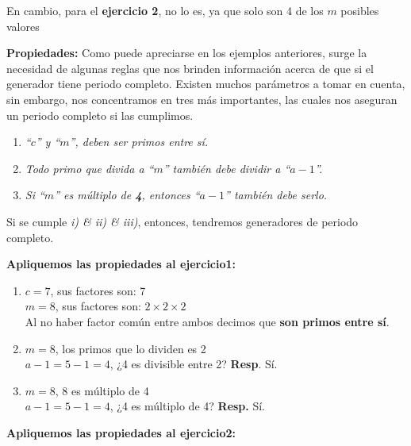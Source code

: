 \documentclass[11pt,letterpaper]{report}
\begin{document}
En cambio, para el \textbf{ejercicio 2}, no lo es, ya que solo son 4 de los $m$ posibles valores

\textbf{Propiedades:} Como puede apreciarse en los ejemplos anteriores, surge la necesidad de algunas reglas que nos brinden información acerca de que si el generador tiene periodo completo. Existen muchos parámetros a tomar en cuenta, sin embargo, nos concentramos en tres más importantes, las cuales nos aseguran un periodo completo si las cumplimos.

\begin{enumerate}[label=\roman*)]
\item \textit{``$c$'' y ``$m$'', deben ser primos entre sí.}
\item \textit{Todo primo que divida a ``$m$'' también debe dividir a ``$a-1$''.}
\item \textit{Si ``$m$'' es múltiplo de \textbf{4}, entonces ``$a-1$'' también debe serlo.}
\end{enumerate}

Si se cumple \textit{i) \& ii) \& iii)}, entonces, tendremos generadores de periodo completo.

\textbf{Apliquemos las propiedades al ejercicio1:}
\begin{enumerate}[label=\roman*)]
\item $c = 7$, sus factores son: 7\\
$m = 8$, sus factores son: $2 \times 2 \times 2$\\
Al no haber factor común entre ambos decimos que \textbf{son primos entre sí}.
\item $m = 8$, los primos que lo dividen es 2\\
$a - 1 = 5 - 1 = 4$, ¿4 es divisible entre 2? \textbf{Resp}. Sí.
\item $m = 8$, 8 es múltiplo de 4\\
$a - 1 = 5 - 1 = 4$, ¿4 es múltiplo de 4? \textbf{Resp.} Sí.
\end{enumerate}

\textbf{Apliquemos las propiedades al ejercicio2:}
\end{document}
